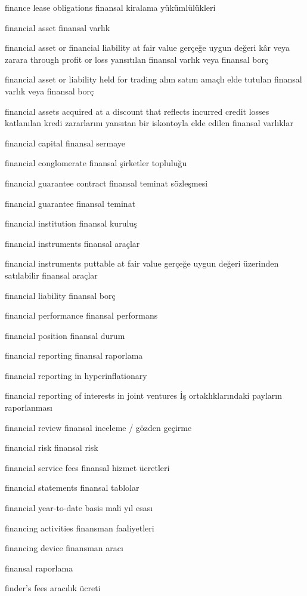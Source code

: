 \documentclass[12pt,fleqn]{article}\usepackage{../../common}
\begin{document}
finance lease obligations finansal kiralama yükümlülükleri

financial asset finansal varlık

financial asset or financial liability at fair value gerçeğe uygun değeri kâr veya zarara through profit or loss yansıtılan finansal varlık veya finansal borç

financial asset or liability held for trading alım satım amaçlı elde tutulan finansal varlık veya finansal borç

financial assets acquired at a discount that reflects incurred credit losses katlanılan kredi zararlarını yansıtan bir iskontoyla elde edilen finansal varlıklar

financial capital finansal sermaye

financial conglomerate finansal şirketler topluluğu

financial guarantee contract finansal teminat sözleşmesi

financial guarantee finansal teminat

financial institution finansal kuruluş

financial instruments finansal araçlar

financial instruments puttable at fair value gerçeğe uygun değeri üzerinden satılabilir finansal araçlar

financial liability finansal borç

financial performance finansal performans

financial position finansal durum

financial reporting finansal raporlama

financial reporting in hyperinflationary

financial reporting of interests in joint ventures İş ortaklıklarındaki payların raporlanması

financial review finansal inceleme / gözden geçirme

financial risk finansal risk

financial service fees finansal hizmet ücretleri

financial statements finansal tablolar

financial year-to-date basis mali yıl esası

financing activities finansman faaliyetleri

financing device finansman aracı

finansal raporlama

finder's fees aracılık ücreti
\end{document}
